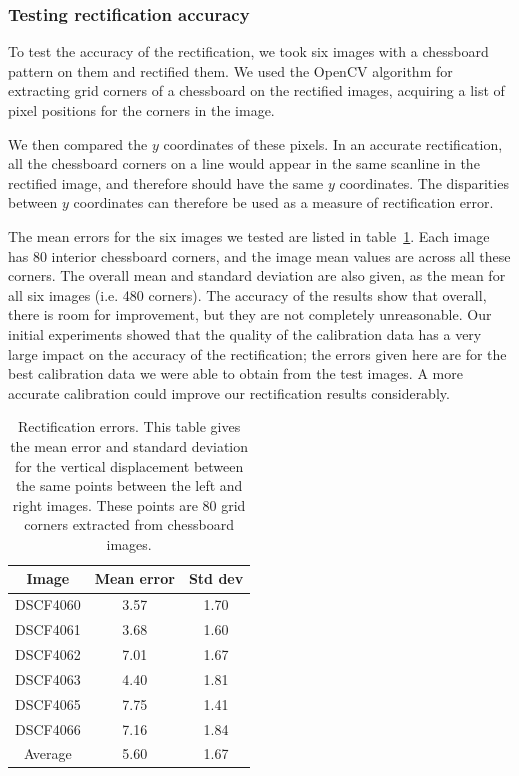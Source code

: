 \subsubsection{Testing rectification accuracy}
To test the accuracy of the rectification, we took six images with a chessboard pattern on them and rectified them. We used the OpenCV algorithm for extracting grid corners of a chessboard on the rectified images, acquiring a list of pixel positions for the corners in the image.

We then compared the $y$ coordinates of these pixels. In an accurate rectification, all the chessboard corners on a line would appear in the same scanline in the rectified image, and therefore should have the same $y$ coordinates. The disparities between $y$ coordinates can therefore be used as a measure of rectification error.

The mean errors for the six images we tested are listed in
table~\ref{tab:rectification-error}. Each image has 80 interior chessboard corners, and the image mean values are across all these corners. The overall
mean and standard deviation are also given, as the mean for all six images (i.e.
480 corners). The accuracy of the results show that overall, there is room for improvement, but they are not completely unreasonable. Our initial experiments showed that
the quality of the calibration data has a very large impact on the accuracy of the
rectification; the errors given here are for the best calibration data we were
able to obtain from the test images. A more accurate calibration could improve our rectification results considerably.

\begin{table}[h]
  \centering
  \begin{tabular}{c c c}
    \toprule
    Image & Mean error & Std dev \\
    \midrule
    DSCF4060 & 3.57  & 1.70 \\
    DSCF4061 & 3.68  & 1.60 \\
    DSCF4062 & 7.01  & 1.67 \\
    DSCF4063 & 4.40  & 1.81 \\
    DSCF4065 & 7.75  & 1.41 \\
    DSCF4066 & 7.16  & 1.84 \\
    \midrule
    Average  & 5.60  & 1.67 \\
    \bottomrule
  \end{tabular}
  \caption[Rectification errors]{Rectification errors. This table gives the mean error and
    standard deviation for the vertical displacement between the same points
    between the left and right images. These points are 80 grid corners extracted from chessboard images.}
  \label{tab:rectification-error}
\end{table}


